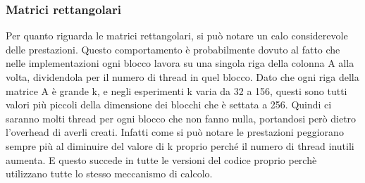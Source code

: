 \documentclass[conference]{IEEEtran}
\begin{document}
\subsubsection{Matrici rettangolari}
Per quanto riguarda le matrici rettangolari, si può notare un calo considerevole delle prestazioni. Questo comportamento è probabilmente dovuto al fatto che nelle implementazioni ogni blocco lavora su una singola riga della colonna A alla volta, dividendola per il numero di thread in quel blocco. Dato che ogni riga della matrice A è grande k, e negli esperimenti k varia da 32 a 156, questi sono tutti valori più piccoli della dimensione dei blocchi che è settata a 256. Quindi ci saranno molti thread per ogni blocco che non fanno nulla, portandosi però dietro l'overhead di averli creati. Infatti come si può notare le prestazioni peggiorano sempre più al diminuire del valore di k proprio perché il numero di thread inutili aumenta. E questo succede in tutte le versioni del codice proprio perchè utilizzano tutte lo stesso meccanismo di calcolo.\\
\end{document}
